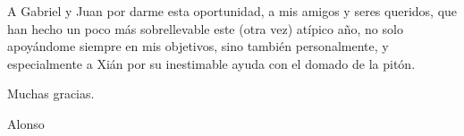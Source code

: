\documentclass[11pt,a4paper,titlepage,twoside,openright,openbib,spanish]{report}
\begin{document}


\paxinaenbranco
\begin{flushright}
\end{flushright}
\paxinaenbranco
\paxinaenbranco
\begin{agradecementos}
A Gabriel y Juan por darme esta oportunidad, a mis amigos y seres queridos, que han hecho un poco más sobrellevable este (otra vez) atípico año, no solo apoyándome siempre en mis objetivos, sino también personalmente, y especialmente a Xián por su inestimable ayuda con el domado de la pitón.

Muchas gracias.

\begin{flushright}
Alonso
\end{flushright}
\end{agradecementos}
\pagestyle{empty}
\paxinaenbranco

\pagestyle{fancy}

\setcounter{page}{1}

\tableofcontents
\listoffigures
\listoftables
\cleardoublepage

\setcounter{page}{1}







% 
% 



% 
% 
% 




\cleardoublepage
\end{document}
